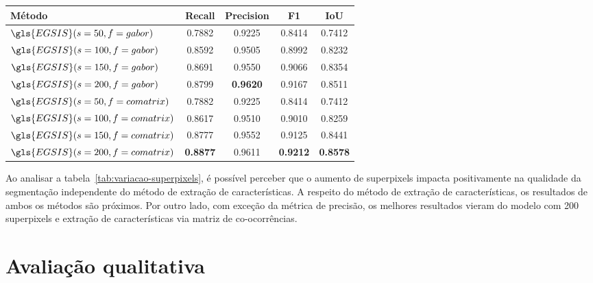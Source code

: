 \begin{table}[!h]
    \centering
  \begin{tabular}{lcccc}
    \toprule
    \textbf{Método}                  & \textbf{Recall} & \textbf{Precision} & \textbf{F1}     & \textbf{IoU}    \\
    \midrule \midrule
    $\gls{EGSIS}(s=50, f=gabor)$     & 0.7882          & 0.9225             & 0.8414          & 0.7412          \\
    $\gls{EGSIS}(s=100, f=gabor)$    & 0.8592          & 0.9505             & 0.8992          & 0.8232          \\
    $\gls{EGSIS}(s=150, f=gabor)$    & 0.8691          & 0.9550             & 0.9066          & 0.8354          \\
    $\gls{EGSIS}(s=200, f=gabor)$    & 0.8799          & \textbf{0.9620}    & 0.9167          & 0.8511          \\
    $\gls{EGSIS}(s=50, f=comatrix)$  & 0.7882          & 0.9225             & 0.8414          & 0.7412          \\
    $\gls{EGSIS}(s=100, f=comatrix)$ & 0.8617          & 0.9510             & 0.9010          & 0.8259          \\
    $\gls{EGSIS}(s=150, f=comatrix)$ & 0.8777          & 0.9552             & 0.9125          & 0.8441          \\
    $\gls{EGSIS}(s=200, f=comatrix)$ & \textbf{0.8877} & 0.9611             & \textbf{0.9212} & \textbf{0.8578} \\
    \bottomrule
  \end{tabular}
  \Fonte{\fonteautor}
\end{table}

Ao analisar a tabela~\ref{tab:variacao-superpixels}, é possível
perceber que o aumento de superpixels impacta positivamente na
qualidade da segmentação independente do método de extração de
características. A respeito do método de extração de características,
os resultados de ambos os métodos são próximos. Por outro lado, com
exceção da métrica de precisão, os melhores resultados vieram do
modelo com 200 superpixels e extração de características via matriz de
co-ocorrências.


\section{Avaliação qualitativa}

